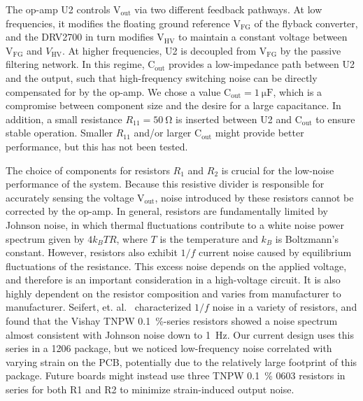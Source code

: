 \documentclass[aip,rsi,reprint]{revtex4-1} %
\begin{document}
The op-amp U2 controls $\text{V}_\text{out}$ via two different feedback pathways.
At low frequencies, it modifies the floating ground reference $\text{V}_\text{FG}$ of the flyback converter, and the DRV2700 in turn modifies $\text{V}_\text{HV}$ to maintain a constant voltage between $\text{V}_\text{FG}$ and $V_\text{HV}$.
At higher frequencies, U2 is decoupled from $\text{V}_\text{FG}$ by the passive filtering network.
In this regime, $\text{C}_\text{out}$ provides a low-impedance path between U2 and the output, such that high-frequency switching noise can be directly compensated for by the op-amp.
We chose a value $\text{C}_\text{out}=\SI{1}{\micro\farad}$, which is a compromise between component size and the desire for a large capacitance.
In addition, a small resistance $R_{11} = \SI{50}{\ohm}$ is inserted between U2 and $\text{C}_\text{out}$ to ensure stable operation.
Smaller $R_{11}$ and/or larger $\text{C}_\text{out}$ might provide better performance, but this has not been tested.

The choice of components for resistors $R_1$ and $R_2$ is crucial for the low-noise performance of the system.
Because this resistive divider is responsible for accurately sensing the voltage $\text{V}_\text{out}$, noise introduced by these resistors cannot be corrected by the op-amp.
In general, resistors are fundamentally limited by Johnson noise, in which thermal fluctuations contribute to a white noise power spectrum given by $4 k_B T R$, where $T$ is the temperature and $k_B$ is Boltzmann's constant.\cite{Horowitz2015a:JN}
However, resistors also exhibit $1/f$ current noise caused by equilibrium fluctuations of the resistance.\cite{Clarke1974a,Voss1976a}
This excess noise depends on the applied voltage, and therefore is an important consideration in a high-voltage circuit.
It is also highly dependent on the resistor composition and varies from manufacturer to manufacturer.
Seifert, et. al.~\cite{Seifert2009a} characterized $1/f$ noise in a variety of resistors, and found that the Vishay TNPW \SI{0.1}{\percent}-series resistors showed a noise spectrum almost consistent with Johnson noise down to \SI{1}{\hertz}.
Our current design uses this series in a 1206 package, but we noticed low-frequency noise correlated with varying strain on the PCB, potentially due to the relatively large footprint of this package.
Future boards might instead use three TNPW \SI{0.1}{\percent} 0603 resistors in series for both R1 and R2 to minimize strain-induced output noise.
\end{document}
